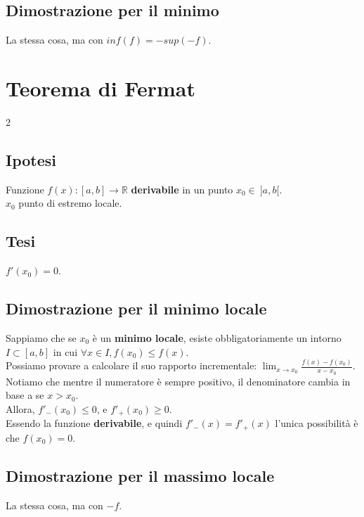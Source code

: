 \documentclass{article}
\begin{document}
\subsection{Dimostrazione per il minimo}
La stessa cosa, ma con \(inf(f) = -sup(-f)\).

\newpage

\section{Teorema di Fermat}

\begin{multicols}{2}
    \subsection{Ipotesi}
    Funzione \(f(x) : [a, b] \to \mathbb{R}\) \textbf{derivabile} in un punto \(x_0 \in\ ]a, b[\).\\
    \(x_0\) punto di estremo locale.
\columnbreak
    \subsection{Tesi}
    \(f'(x_0) = 0\).

\end{multicols}

\subsection{Dimostrazione per il minimo locale}
Sappiamo che se \(x_0\) è un \textbf{minimo locale}, esiste obbligatoriamente un intorno \(I \subset [a, b]\) in cui \(\forall x \in I, f(x_0) \leq f(x)\).\\
Possiamo provare a calcolare il suo rapporto incrementale: \(\lim_{x \to x_0} \frac{f(x) - f(x_0)}{x - x_0}\).\\
Notiamo che mentre il numeratore è sempre positivo, il denominatore cambia in base a se \(x > x_0\).\\
Allora, \(f'_-(x_0) \leq 0\), e \(f'_+(x_0) \geq 0\).\\
Essendo la funzione \textbf{derivabile}, e quindi \(f'_-(x) = f'_+(x)\) l'unica possibilità è che \(f(x_0) = 0\).

\subsection{Dimostrazione per il massimo locale}
La stessa cosa, ma con \(-f\).

\newpage
\end{document}
